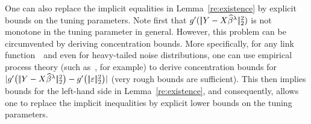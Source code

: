 \documentclass[bj]{imsart}
\newcommand{\normtwo}[1]{\ensuremath{\!|\!| #1 | \! |_{2}}}
\newcommand{\normqjd}[1]{\ensuremath{\!|\!| #1 | \! |_{q_j}^*}}
\newtheorem{definition}{Definition}[section]
\newcommand{\1}{{\rm 1}\mskip -4,5mu{\rm l} }
\newcommand{\est}{\widehat\beta}
\newcommand{\lo}{\overline{\lambda}}
\begin{document}


One can also replace the implicit equalities in Lemma~\ref{re:existence} by explicit bounds on the tuning parameters. Note first that $g'(\,\normtwo{\outcome-\design\estimatort}^2)$ is not monotone in the tuning parameter in general. However, this problem can be circumvented by deriving concentration bounds. More specifically,  for any link function~\linkfunction\ and even for heavy-tailed noise distributions, one can use empirical process theory (such as~\cite{YoyoSara12}, for example) to derive concentration bounds for $|\linkfunction'\big(\,\normtwo{\outcome-\design\estimatort}^2\big)- \linkfunction'\big(\,\normtwo{\noise}^2\big)|$ (very rough bounds are sufficient). This then implies bounds for the left-hand side in Lemma~\ref{re:existence}, and consequently, allows one to replace the implicit inequalities by explicit lower bounds on the tuning parameters.

\pagebreak
\end{document}
